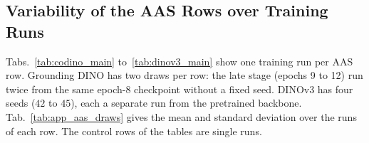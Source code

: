 \subsection{Variability of the AAS Rows over Training Runs}
\label{app:aas_draws}

\noindent Tabs.~\ref{tab:codino_main} to~\ref{tab:dinov3_main} show one training run per AAS row. Grounding DINO has two draws per row: the late stage (epochs 9 to 12) run twice from the same epoch-8 checkpoint without a fixed seed. DINOv3 has four seeds ($42$ to $45$), each a separate run from the pretrained backbone. Tab.~\ref{tab:app_aas_draws} gives the mean and standard deviation over the runs of each row. The control rows of the tables are single runs.

\begin{table}[!htp]%
\centering
\small
\setlength{\tabcolsep}{3.3pt}%
\caption{\textbf{Spread of the AAS rows over training runs.} The standard deviation is at most $0.5$ p.p.\ in every column. Mean $\pm$ sample standard deviation of the AAS rows of Tabs.~\ref{tab:grounding_dino_main} and~\ref{tab:dinov3_main} on COCO and STRANGE-Bench: Grounding DINO over two late-stage draws, DINOv3 over seeds $42$ to $45$.}
\label{tab:app_aas_draws}

\end{table}
